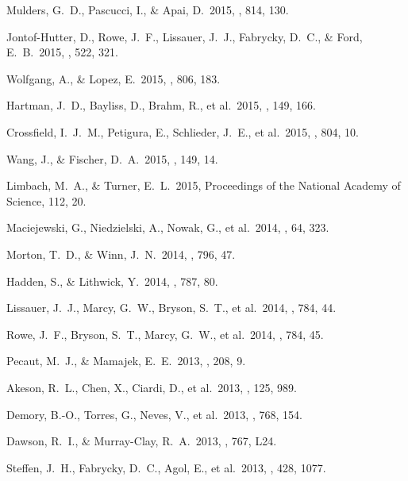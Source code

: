  Mulders, G.~D., Pascucci, I., \& Apai, D.\ 2015, \apj, 814, 130.

 Jontof-Hutter, D., Rowe, J.~F., Lissauer, J.~J., Fabrycky, D.~C., \& Ford, E.~B.\ 2015, \nat, 522, 321.

 Wolfgang, A., \& Lopez, E.\ 2015, \apj, 806, 183.

 Hartman, J.~D., Bayliss, D., Brahm, R., et al.\ 2015, \aj, 149, 166.

 Crossfield, I.~J.~M., Petigura, E., Schlieder, J.~E., et al.\ 2015, \apj, 804, 10.

 Wang, J., \& Fischer, D.~A.\ 2015, \aj, 149, 14.

 Limbach, M.~A., \& Turner, E.~L.\ 2015, Proceedings of the National Academy of Science, 112, 20.

 Maciejewski, G., Niedzielski, A., Nowak, G., et al.\ 2014, \actaa, 64, 323.

 Morton, T.~D., \& Winn, J.~N.\ 2014, \apj, 796, 47.

 Hadden, S., \& Lithwick, Y.\ 2014, \apj, 787, 80.

 Lissauer, J.~J., Marcy, G.~W., Bryson, S.~T., et al.\ 2014, \apj, 784, 44.

 Rowe, J.~F., Bryson, S.~T., Marcy, G.~W., et al.\ 2014, \apj, 784, 45.

 Pecaut, M.~J., \& Mamajek, E.~E.\ 2013, \apjs, 208, 9.

 Akeson, R.~L., Chen, X., Ciardi, D., et al.\ 2013, \pasp, 125, 989.

 Demory, B.-O., Torres, G., Neves, V., et al.\ 2013, \apj, 768, 154.

 Dawson, R.~I., \& Murray-Clay, R.~A.\ 2013, \apjl, 767, L24.

 Steffen, J.~H., Fabrycky, D.~C., Agol, E., et al.\ 2013, \mnras, 428, 1077.

